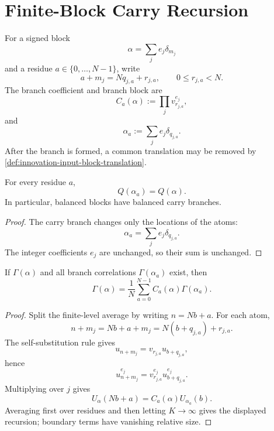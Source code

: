 \section{Finite-Block Carry Recursion}
\label{sec:innovation-input-finite-block-carry-recursion}

\begin{definition}
\label{def:innovation-input-signed-block-carry-branch}
For a signed block
$$
\alpha=\sum_j e_j\delta_{m_j}
$$
and a residue $a\in\{0,\ldots,N-1\}$, write
$$
a+m_j=Nq_{j,a}+r_{j,a},
\qquad
0\le r_{j,a}<N.
$$
The branch coefficient and branch block are
$$
C_a(\alpha):=\prod_j v_{r_{j,a}}^{e_j},
$$
and
$$
\alpha_a:=\sum_j e_j\delta_{q_{j,a}}.
$$
After the branch is formed, a common translation may be removed by
\autoref{def:innovation-input-block-translation}.
\end{definition}

\begin{lemma}
\label{lem:innovation-input-carry-branch-charge-preservation}
For every residue $a$,
$$
Q(\alpha_a)=Q(\alpha).
$$
In particular, balanced blocks have balanced carry branches.
\end{lemma}

\begin{proof}
The carry branch changes only the locations of the atoms:
$$
\alpha_a=\sum_j e_j\delta_{q_{j,a}}.
$$
The integer coefficients $e_j$ are unchanged, so their sum is unchanged.
\end{proof}

\begin{theorem}
\label{thm:innovation-input-finite-block-carry-recursion}
If $\Gamma(\alpha)$ and all branch correlations $\Gamma(\alpha_a)$ exist,
then
$$
\Gamma(\alpha)
=
\frac1N
\sum_{a=0}^{N-1}
C_a(\alpha)\Gamma(\alpha_a).
$$
\end{theorem}

\begin{proof}
Split the finite-level average by writing $n=Nb+a$. For each atom,
$$
n+m_j=Nb+a+m_j=N(b+q_{j,a})+r_{j,a}.
$$
The self-substitution rule gives
$$
u_{n+m_j}=v_{r_{j,a}}u_{b+q_{j,a}},
$$
hence
$$
u_{n+m_j}^{e_j}
=
v_{r_{j,a}}^{e_j}u_{b+q_{j,a}}^{e_j}.
$$
Multiplying over $j$ gives
$$
U_\alpha(Nb+a)=C_a(\alpha)U_{\alpha_a}(b).
$$
Averaging first over residues and then letting $K\to\infty$ gives the
displayed recursion; boundary terms have vanishing relative size.
\end{proof}

